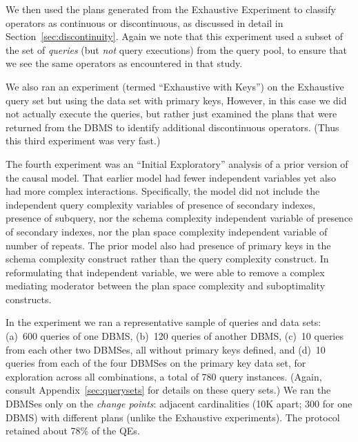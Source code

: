 \documentclass[prodmode,acmtods]{acmsmall}
\begin{document}
We then used the plans generated from the Exhaustive Experiment to classify operators as
continuous or discontinuous, as discussed in detail in
Section~\ref{sec:discontinuity}. Again we note that this experiment used a subset of
the set of {\em queries} (but {\em not} query executions) from the query pool,
to ensure that we see the same operators as encountered in that
study.

We also ran an experiment (termed ``Exhaustive with Keys'') on the 
Exhaustive query set but using the data set with primary keys,  However, in this
case we did not actually execute
the queries, but rather just examined the plans that were returned from the
\hbox{DBMS} to identify additional discontinuous operators. (Thus this third
experiment was very fast.)

The fourth experiment was an ``Initial Exploratory'' 
analysis of a prior version of the causal model.
That earlier model had fewer independent
variables yet also had more complex interactions. Specifically, the model
did not include the independent query complexity variables of presence of
secondary indexes, presence of subquery, nor the schema complexity
independent variable of presence of secondary indexes, nor the plan space
complexity independent variable of number of repeats. The prior model also
had presence of primary keys in the schema complexity construct rather than
the query complexity construct. In reformulating that independent variable,
we were able to remove a complex mediating moderator between the plan
space complexity and suboptimality constructs.

In the experiment we ran a representative sample of queries and data sets: (a)~600 queries of one
\hbox{DBMS}, (b)~120 queries of another \hbox{DBMS}, (c)~10 queries
from each other two \hbox{DBMSes}, all without primary keys defined, and (d)~10 queries
from each of the four \hbox{DBMSes} on the primary key data set, for exploration
across all combinations, a total of 780 query instances.  (Again, consult
Appendix~\ref{sec:querysets} for details on these query sets.)
We ran the \hbox{DBMSes} only on the {\em
  change points}: adjacent cardinalities (10K apart; 300 for one \hbox{DBMS}) with different
plans (unlike the Exhaustive experiments). The protocol retained about 78\% of the QEs. 
\end{document}
